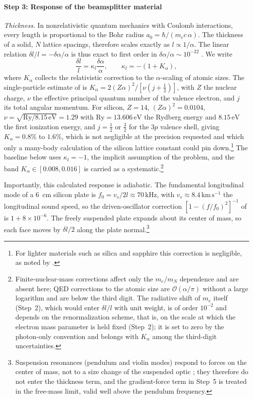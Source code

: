 \paragraph*{Step 3: Response of the beamsplitter material}
\emph{Thickness.} In nonrelativistic quantum mechanics with Coulomb interactions, every length is proportional to the Bohr radius $a_0=\hbar/(m_e c\,\alpha)$. The thickness of a solid, $N$ lattice spacings, therefore scales exactly as $l\propto1/\alpha$. The linear relation $\delta l/l=-\delta\alpha/\alpha$ is thus exact to first order in $\delta\alpha/\alpha\sim10^{-22}$ \citep{StadnikFlambaum2015,GroteStadnik2019}. We write
\begin{equation}
\frac{\delta l}{l}=\kappa_l\frac{\delta\alpha}{\alpha},\qquad \kappa_l=-(1+K_\alpha),
\label{eq:kappal}
\end{equation}
where $K_\alpha$ collects the relativistic correction to the $\alpha$-scaling of atomic sizes. The single-particle estimate of \citet[Eq.~12]{StadnikFlambaum2015} is $K_\alpha=2(Z\alpha)^2/[\nu(j+\tfrac12)]$, with $Z$ the nuclear charge, $\nu$ the effective principal quantum number of the valence electron, and $j$ its total angular momentum. For silicon, $Z=14$, $(Z\alpha)^2=0.0104$, $\nu=\sqrt{\mathrm{Ry}/8.15\,\mathrm{eV}}=1.29$ with $\mathrm{Ry}=13.606\,\mathrm{eV}$ the Rydberg energy and $8.15\,\mathrm{eV}$ the first ionization energy, and $j=\tfrac12$ or $\tfrac32$ for the $3p$ valence shell, giving $K_\alpha=0.8\%$ to $1.6\%$, which is not negligible at the precision requested and which only a many-body calculation of the silicon lattice constant could pin down.\footnote{For lighter materials such as silica and sapphire this correction is negligible, as noted by \citet{GroteStadnik2019}.} The baseline below uses $\kappa_l=-1$, the implicit assumption of the problem, and the band $K_\alpha\in[0.008,0.016]$ is carried as a systematic.\footnote{Finite-nuclear-mass corrections affect only the $m_e/m_N$ dependence and are absent here; QED corrections to the atomic size are $\mathcal O(\alpha/\pi)$ without a large logarithm and are below the third digit. The radiative shift of $m_e$ itself (Step~2), which would enter $\delta l/l$ with unit weight, is of order $10^{-2}$ and depends on the renormalization scheme, that is, on the scale at which the electron mass parameter is held fixed (Step~2); it is set to zero by the photon-only convention and belongs with $K_\alpha$ among the third-digit uncertainties.}

Importantly, this calculated response is adiabatic. The fundamental longitudinal mode of a $6$~cm silicon plate is $f_0=v_s/2l\approx70\,\mathrm{kHz}$, with $v_s\approx8.4\,\mathrm{km\,s^{-1}}$ the longitudinal sound speed, so the driven-oscillator correction $[1-(f/f_0)^2]^{-1}$ of \citet[Eq.~7]{GroteStadnik2019} is $1+8\times10^{-6}$. The freely suspended plate expands about its center of mass, so each face moves by $\delta l/2$ along the plate normal.\footnote{Suspension resonances (pendulum and violin modes) respond to forces on the center of mass, not to a size change of the suspended optic \citep{Geraci2019,GroteStadnik2019}; they therefore do not enter the thickness term, and the gradient-force term in Step~5 is treated in the free-mass limit, valid well above the pendulum frequency.}


